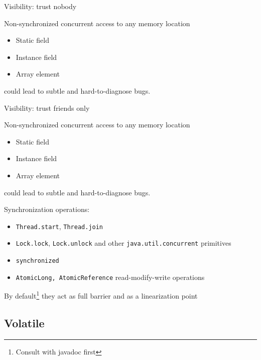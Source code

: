 \begin{frame}[t,fragile]{Visibility: trust nobody}

Non-synchronized concurrent access to any memory location
\begin{itemize}
  \item Static field
  \item Instance field
  \item Array element
\end{itemize}
could lead to subtle and hard-to-diagnose bugs.
\end{frame}


\begin{frame}{Visibility: trust friends only}

Non-synchronized concurrent access to any memory location
\begin{itemize}
  \item Static field
  \item Instance field
  \item Array element
\end{itemize}
could lead to subtle and hard-to-diagnose bugs.

Synchronization operations:
\begin{itemize}
  \item \texttt{Thread.start}, \texttt{Thread.join}
  \item \texttt{Lock.lock}, \texttt{Lock.unlock} and other \texttt{java.util.concurrent} primitives
  \item \texttt{synchronized}
  \item \texttt{AtomicLong, AtomicReference} read-modify-write operations
\end{itemize}

\pause

By default\footnote<2->{Consult with javadoc first} they act as full barrier \pause and as a linearization point

\end{frame}

\subsection{Volatile}
\showTOCSub

